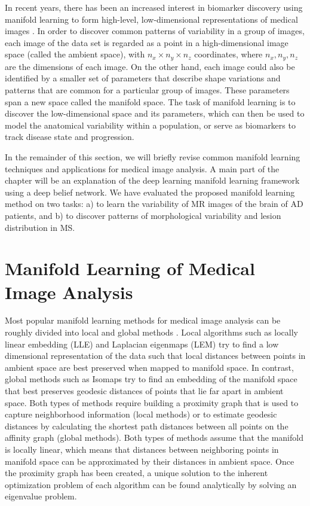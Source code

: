 In recent years, there has been an increased interest in biomarker discovery
using manifold learning to form high-level, low-dimensional representations of
medical images \citep{wolz2010b,aljabar2011,wolz2012}. In order to discover
common patterns of variability in a group of images, each image of the data set
is regarded as a point in a high-dimensional image space (called the ambient
space), with $n_x \times n_y \times n_z$ coordinates, where $n_x, n_y, n_z$ are
the dimensions of each image. On the other hand, each image could also be
identified by a smaller set of parameters that describe shape variations and
patterns that are common for a particular group of images. These parameters span
a new space called the manifold space. The task of manifold learning is to
discover the low-dimensional space and its parameters, which can then be used to
model the anatomical variability within a population, or serve as biomarkers to
track disease state and progression.

In the remainder of this section, we will briefly revise common manifold
learning techniques and applications for medical image analysis. A main part of
the chapter will be an explanation of the deep learning manifold learning
framework using a deep belief network. We have evaluated the proposed manifold
learning method on two tasks: a) to learn the variability of MR images of the
brain of AD patients, and b) to discover patterns of morphological variability
and lesion distribution in MS.

\section{Manifold Learning of Medical Image Analysis}


Most popular manifold learning methods for medical image analysis can be roughly
divided into local and global methods \citep{cayton2005}. Local algorithms such
as locally linear embedding (LLE) \citep{saul2003} and Laplacian eigenmaps (LEM)
\citep{belkin2002} try to find a low dimensional representation of the data such
that local distances between points in ambient space are best preserved when
mapped to manifold space. In contrast, global methods such as Isomaps
\citep{tenenbaum2000} try to find an embedding of the manifold space that best
preserves geodesic distances of points that lie far apart in ambient space. Both
types of methods require building a proximity graph that is used to capture
neighborhood information (local methods) or to estimate geodesic distances by
calculating the shortest path distances between all points on the affinity graph
(global methods). Both types of methods assume that the manifold is locally
linear, which means that distances between neighboring points in manifold space
can be approximated by their distances in ambient space. Once the proximity
graph has been created, a unique solution to the inherent optimization problem
of each algorithm can be found analytically by solving an eigenvalue problem.



